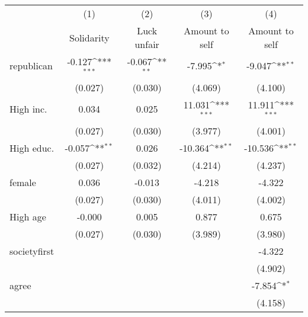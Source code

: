{
\def\sym#1{\ifmmode^{#1}\else\(^{#1}\)\fi}
\begin{tabular}{l*{4}{c}}
\toprule
                    &\multicolumn{1}{c}{(1)}&\multicolumn{1}{c}{(2)}&\multicolumn{1}{c}{(3)}&\multicolumn{1}{c}{(4)}\\
                    &\multicolumn{1}{c}{Solidarity}&\multicolumn{1}{c}{Luck unfair}&\multicolumn{1}{c}{Amount to self}&\multicolumn{1}{c}{Amount to self}\\
\midrule
republican          &      -0.127\sym{***}&      -0.067\sym{**} &      -7.995\sym{*}  &      -9.047\sym{**} \\
                    &     (0.027)         &     (0.030)         &     (4.069)         &     (4.100)         \\
\addlinespace
High inc.           &       0.034         &       0.025         &      11.031\sym{***}&      11.911\sym{***}\\
                    &     (0.027)         &     (0.030)         &     (3.977)         &     (4.001)         \\
\addlinespace
High educ.          &      -0.057\sym{**} &       0.026         &     -10.364\sym{**} &     -10.536\sym{**} \\
                    &     (0.027)         &     (0.032)         &     (4.214)         &     (4.237)         \\
\addlinespace
female              &       0.036         &      -0.013         &      -4.218         &      -4.322         \\
                    &     (0.027)         &     (0.030)         &     (4.011)         &     (4.002)         \\
\addlinespace
High age            &      -0.000         &       0.005         &       0.877         &       0.675         \\
                    &     (0.027)         &     (0.030)         &     (3.989)         &     (3.980)         \\
\addlinespace
societyfirst        &                     &                     &                     &      -4.322         \\
                    &                     &                     &                     &     (4.902)         \\
\addlinespace
agree               &                     &                     &                     &      -7.854\sym{*}  \\
                    &                     &                     &                     &     (4.158)         \\

\end{tabular}}
